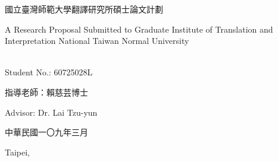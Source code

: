 \makeatletter
\begin{titlepage}%
  \begin{center}%
    {\large 國立臺灣師範大學翻譯研究所碩士論文計劃\par}

    {\large A Research Proposal Submitted to Graduate Institute of Translation and Interpretation National Taiwan Normal University\par}
    \par
  \end{center}%
  \vspace{1cm plus 1fill}
  \begin{flushleft}%
    {{\Large\bfseries \@author}\\
      Student No.: 60725028L\par}
  \end{flushleft}%
  \vspace{8mm plus 1mm minus 2mm}
  \begin{center}%
    {\Large\textbf{\titlezh}\par}\par
    \vspace{1em}
    {\huge\textbf{\@title}\par}
    \vspace{2cm plus 1.5fill}
    {\large 指導老師：賴慈芸博士}\par
    \vspace{0.5em}
    {\large Advisor: Dr. Lai Tzu-yun}\par
    \vspace{2cm}
    {\large 中華民國一〇九年三月}\par
    \vspace{0.5em}
    {\large Taipei, \@date}
  \end{center}
\end{titlepage}%
\makeatother
